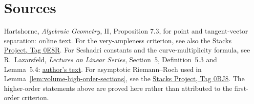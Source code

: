 \documentclass[12pt,a4paper,psamsfonts]{amsart}
\theoremstyle{definition}
\begin{document}
\section*{Sources}
Hartshorne, \emph{Algebraic Geometry}, II, Proposition 7.3, for point
and tangent-vector separation:
\href{https://djvu.online/file/nBitrL383m1P0}{online text}.
For the very-ampleness criterion, see also the
\href{https://stacks.math.columbia.edu/tag/0E8R}{Stacks Project, Tag 0E8R}.
For Seshadri constants and the curve-multiplicity formula, see
R.~Lazarsfeld, \emph{Lectures on Linear Series}, Section~5,
Definition~5.3 and Lemma~5.4:
\href{https://www.math.stonybrook.edu/~roblaz/Reprints/Lazarsfeld.LLS.pdf}{author's text}.
For asymptotic Riemann--Roch used in
Lemma~\ref{lem:volume-high-order-sections}, see the
\href{https://stacks.math.columbia.edu/tag/0BJ8}{Stacks Project, Tag 0BJ8}.
The higher-order statements above are proved here rather than attributed
to the first-order criterion.
\end{document}
